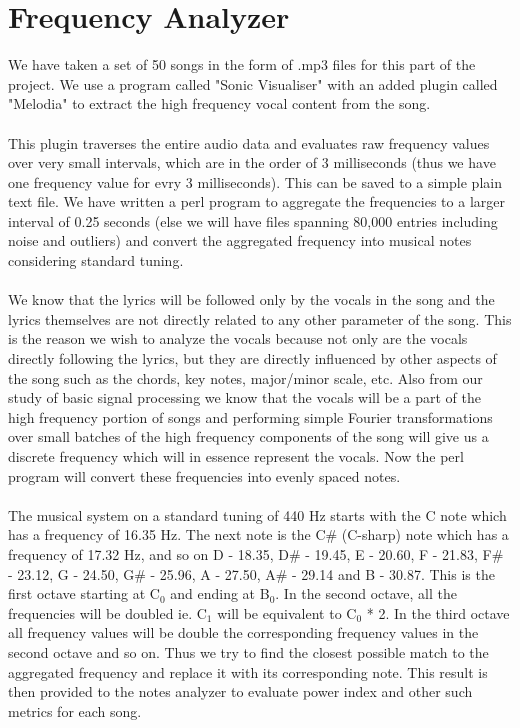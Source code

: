 \documentclass[letterpaper, 11pt]{article}
\begin{document}
\section*{Frequency Analyzer}
We have taken a set of 50 songs in the form of .mp3 files for this part of the project. We use a program called "Sonic Visualiser" with an added plugin called "Melodia" to extract the high frequency vocal content from the song. \\\\ This plugin traverses the entire audio data and evaluates raw frequency values over very small intervals, which are in the order of 3 milliseconds (thus we have one frequency value for evry 3 milliseconds). This can be saved to a simple plain text file. We have written a perl program to aggregate the frequencies to a larger interval of 0.25 seconds (else we will have files spanning 80,000 entries including noise and outliers) and convert the aggregated frequency into musical notes considering standard tuning.\\\\We know that the lyrics will be followed only by the vocals in the song and the lyrics themselves are not directly related to any other parameter of the song. This is the reason we wish to analyze the vocals because not only are the vocals directly following the lyrics, but they are directly influenced by other aspects of the song such as the chords, key notes, major/minor scale, etc. Also from our study of basic signal processing we know that the vocals will be a part of the high frequency portion of songs and performing simple Fourier transformations over small batches of the high frequency components of the song will give us a discrete frequency which will in essence represent the vocals. Now the perl program will convert these frequencies into evenly spaced notes.\\\\The musical system on a standard tuning of 440 Hz starts with the C note which has a frequency of 16.35 Hz. The next note is the C\# (C-sharp) note which has a frequency of 17.32 Hz, and so on D - 18.35, D\# - 19.45, E - 20.60, F - 21.83, F\# - 23.12, G - 24.50, G\# - 25.96, A - 27.50, A\# - 29.14 and B - 30.87. This is the first octave starting at C$_0$ and ending at B$_0$. In the second octave, all the frequencies will be doubled ie. C$_1$ will be equivalent to C$_0$ * 2. In the third octave all frequency values will be double the corresponding frequency values in the second octave and so on. Thus we try to find the closest possible match to the aggregated frequency and replace it with its corresponding note. This result is then provided to the notes analyzer to evaluate power index and other such metrics for each song.
\end{document}
